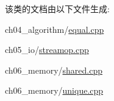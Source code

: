 该类的文档由以下文件生成\+:\begin{DoxyCompactItemize}
\item 
ch04\+\_\+algorithm/\mbox{\hyperlink{equal_8cpp}{equal.\+cpp}}\item 
ch05\+\_\+io/\mbox{\hyperlink{streamop_8cpp}{streamop.\+cpp}}\item 
ch06\+\_\+memory/\mbox{\hyperlink{ch06__memory_2shared_8cpp}{shared.\+cpp}}\item 
ch06\+\_\+memory/\mbox{\hyperlink{unique_8cpp}{unique.\+cpp}}\end{DoxyCompactItemize}
